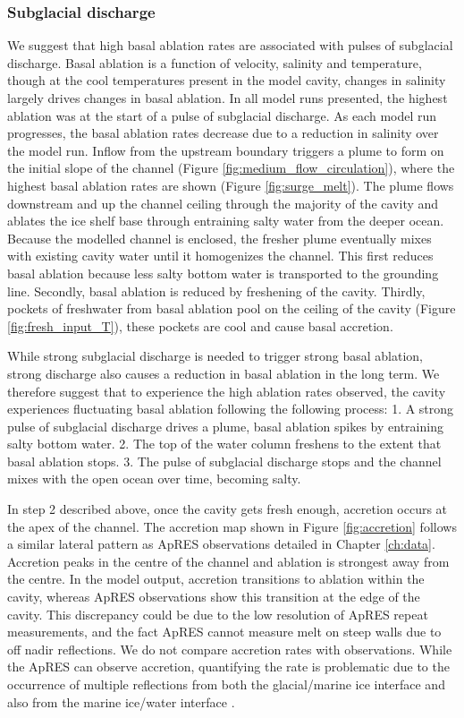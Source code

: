 \subsubsection{Subglacial discharge} \label{sec:ocean_pulse}
We suggest that high basal ablation rates are associated with pulses of subglacial discharge.  Basal ablation is a function of velocity, salinity and temperature, though at the cool temperatures present in the model cavity, changes in salinity largely drives changes in basal ablation.  
In all model runs presented, the highest ablation was at the start of a pulse of subglacial discharge. As each model run progresses, the basal ablation rates decrease due to a reduction in salinity over the model run. 
Inflow from the upstream boundary triggers a plume to form on the initial slope of the channel (Figure \ref{fig:medium_flow_circulation}), where the highest basal ablation rates are shown (Figure \ref{fig:surge_melt}). The plume flows downstream and up the channel ceiling through the majority of the cavity and ablates the ice shelf base through entraining salty water from the deeper ocean. Because the modelled channel is enclosed, the fresher plume eventually mixes with existing cavity water until it homogenizes the channel. This first reduces basal ablation because less salty bottom water is transported to the grounding line. Secondly, basal ablation is reduced by freshening of the cavity.  Thirdly, pockets of freshwater from basal ablation pool on the ceiling of the cavity (Figure \ref{fig:fresh_input_T}), these pockets are cool and cause basal accretion.

While strong subglacial discharge is needed to trigger strong basal ablation, strong discharge also causes a reduction in basal ablation in the long term. We therefore suggest that to experience the high ablation rates observed, the cavity experiences fluctuating basal ablation following the following process: 1. A strong pulse of subglacial discharge drives a plume, basal ablation spikes by entraining salty bottom water. 2. The top of the water column freshens to the extent that basal ablation stops.  3. The pulse of subglacial discharge stops and the channel mixes with the open ocean over time, becoming salty.

In step 2 described above, once the cavity gets fresh enough, accretion occurs at the apex of the channel. The accretion map shown in Figure \ref{fig:accretion} follows a similar lateral pattern as ApRES observations detailed in Chapter \ref{ch:data}. 
Accretion peaks in the centre of the channel and ablation is strongest away from the centre. In the model output, accretion transitions to ablation within the cavity, whereas ApRES observations show this transition at the edge of the cavity.
This discrepancy could be due to the low resolution of ApRES repeat measurements, and the fact ApRES cannot measure melt on steep walls due to off nadir reflections. We do not compare accretion rates with observations. While the ApRES can observe accretion, quantifying the rate is problematic due to the occurrence of multiple reflections from both the glacial/marine ice interface and also from the marine ice/water interface \citep{craig_personal_comm}.


